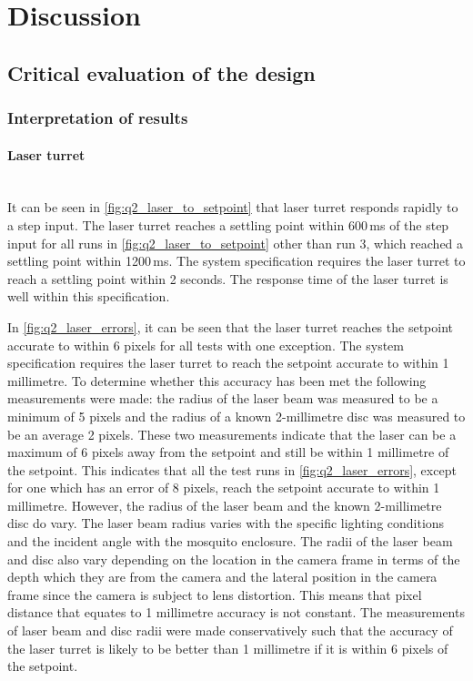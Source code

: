 
\section{Discussion}

\subsection{Critical evaluation of the design}

\subsubsection{Interpretation of results}
\paragraph{Laser turret}\hfill\\
It can be seen in \autoref{fig:q2_laser_to_setpoint} that laser turret responds rapidly to a step input. The laser turret reaches a settling point within 600\,ms of the step input for all runs in \autoref{fig:q2_laser_to_setpoint} other than run 3, which reached a settling point within 1200\,ms. The system specification requires the laser turret to reach a settling point within 2 seconds. The response time of the laser turret is well within this specification.

In \autoref{fig:q2_laser_errors}, it can be seen that the laser turret reaches the setpoint accurate to within 6 pixels for all tests with one exception. The system specification requires the laser turret to reach the setpoint accurate to within 1 millimetre. To determine whether this accuracy has been met the following measurements were made: the radius of the laser beam was measured to be a minimum of 5 pixels and the radius of a known 2-millimetre disc was measured to be an average 2 pixels. These two measurements indicate that the laser can be a maximum of 6 pixels away from the setpoint and still be within 1 millimetre of the setpoint. This indicates that all the test runs in \autoref{fig:q2_laser_errors}, except for one which has an error of 8 pixels, reach the setpoint accurate to within 1 millimetre. However, the radius of the laser beam and the known 2-millimetre disc do vary. The laser beam radius varies with the specific lighting conditions and the incident angle with the mosquito enclosure. The radii of the laser beam and disc also vary depending on the location in the camera frame in terms of the depth which they are from the camera and the lateral position in the camera frame since the camera is subject to lens distortion. This means that pixel distance that equates to 1 millimetre accuracy is not constant. The measurements of laser beam and disc radii were made conservatively such that the accuracy of the laser turret is likely to be better than 1 millimetre if it is within 6 pixels of the setpoint.

